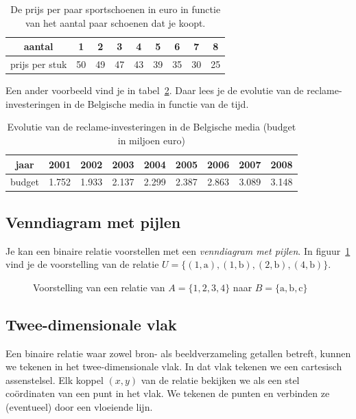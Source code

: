 \begin{table}[htbp]
\centering
\caption{De prijs per paar  sportschoenen in euro in functie van het aantal paar schoenen dat je koopt.}
\begin{tabular}{ccccccccc}
\hline 
aantal & 1 & 2 & 3 & 4 & 5 & 6 & 7 & 8 \\ 
\hline 
prijs per stuk & 50 & 49 & 47 & 43 & 39 & 35 & 30 & 25 \\ 
\hline 
\end{tabular} 
\label{tab:sportschoenen}
\end{table}

Een ander voorbeeld vind je in tabel~\ref{tab:reclame}. Daar lees  je de evolutie van de reclame-investeringen in de Belgische media in functie van de tijd.
\begin{table}[htbp]
\centering
\caption{Evolutie van de reclame-investeringen in de Belgische media (budget in miljoen euro)}
\begin{tabular}{ccccccccc}
\toprule
jaar & 2001 & 2002 & 2003 & 2004 & 2005 & 2006 & 2007 & 2008 \\ 
\midrule
budget & \num{1.752} & \num{1.933} & \num{2.137} & \num{2.299} & \num{2.387} & \num{2.863} & \num{3.089} & \num{3.148} \\ 
\bottomrule
\end{tabular} 
\label{tab:reclame}
\end{table}

\subsection{Venndiagram met pijlen}
Je kan een binaire relatie  voorstellen met een \emph{venndiagram met pijlen}. In figuur~\ref{fig:grafiek} vind je de voorstelling van de relatie $U=\{(1,\mathrm{a}),(1,\mathrm{b}),(2,\mathrm{b}),(4,\mathrm{b}) \}$. 

\begin{figure}[htbp]
\centering

\caption{Voorstelling van een relatie van $A=\{1,2,3,4\}$ naar $B=\{\mathrm{a},\mathrm{b},\mathrm{c} \}$}
\label{fig:grafiek}
\end{figure}

\subsection{Twee-dimensionale vlak}
Een binaire relatie waar zowel bron- als beeldverzameling getallen betreft, kunnen we tekenen in 
het twee-dimensionale vlak. In dat vlak tekenen we  een cartesisch 
assenstelsel. Elk koppel $(x,y)$ van de relatie bekijken we als een 
stel co\"ordinaten van een punt in het vlak. We tekenen de punten en 
verbinden ze (eventueel) door een vloeiende lijn.

